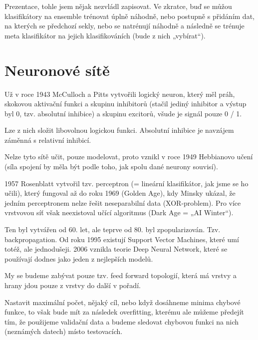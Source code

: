 \documentclass[12pt]{article}					%
\begin{document}

        Prezentace, tohle jsem nějak nezvládl zapisovat. Ve zkratce, buď se můžou klasifikátory na ensemble trénovat úplně náhodně, nebo postupně s přidáním dat, na kterých se předchozí sekly, nebo se natrénují náhodně a následně se trénuje meta klasifikátor na jejich klasifikováních (bude z nich „vybírat“).

\section{Neuronové sítě}
    \begin{poznamka}[Historie]
        Už v roce 1943 McCulloch a Pitts vytvořili logický neuron, který měl práh, skokovou aktivační funkci a skupinu inhibitorů (stačil jediný inhibitor a výstup byl 0, tzv. absolutní inhibice) a skupinu excitorů, všude je signál pouze 0 / 1.

        Lze z nich složit libovolnou logickou funkci. Absolutní inhibice je navzájem záměnná s relativní inhibicí.
        
        Nelze tyto sítě učit, pouze modelovat, proto vznikl v roce 1949 Hebbianovo učení (síla spojení by měla být podle toho, jak spolu dané neurony souvisí).

        1957 Rosenblatt vytvořil tzv. perceptron (= lineární klasifikátor, jak jsme se ho učili), který fungoval až do roku 1969 (Golden Age), kdy Minsky ukázal, že jedním perceptronem nelze řešit neseparabilní data (XOR-problem). Pro více vrstvovou síť však neexistoval učící algoritmus (Dark Age = „AI Winter“).

        Ten byl vytvářen od 60. let, ale teprve od 80. byl zpopularizován. Tzv. backpropagation. Od roku 1995 existují Support Vector Machines, které umí totéž, ale jednodušeji. 2006 vznikla teorie Deep Neural Network, které se používají dodnes jako jeden z nejlepších modelů.
    \end{poznamka}

    \begin{definice}
        My se budeme zabývat pouze tzv. feed forward topologií, která má vrstvy a hrany jdou pouze z vrstvy do další v pořadí.
    \end{definice}


    \begin{poznamka}
        Nastavit maximální počet, nějaký cíl, nebo když dosáhneme minima chybové funkce, to však bude mít za následek overfitting, kterému ale můžeme předejít tím, že použijeme validační data a budeme sledovat chybovou funkci na nich (neznámých datech) místo testovacích.
    \end{poznamka}
\end{document}
